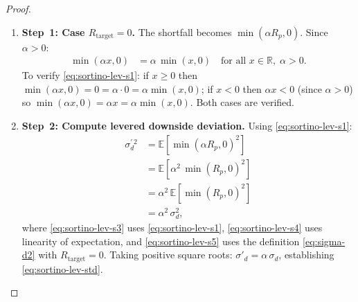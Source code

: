 \documentclass[12pt,openany]{book}
\newcommand{\E}{\mathbb{E}}
\numberwithin{equation}{chapter}
\theoremstyle{plain}
\theoremstyle{definition}
\theoremstyle{remark}
\numberwithin{equation}{chapter}
\theoremstyle{plain}
\begin{document}
\begin{proof}
\begin{enumerate}
  \item \textbf{Step~1: Case $R_{\mathrm{target}} = 0$.}
        The shortfall becomes
        $\min(\alpha R_p, 0)$.  Since $\alpha > 0$:
        \begin{align}
          \min(\alpha x, 0)
            &= \alpha\,\min(x, 0)
             \quad \text{for all } x \in \mathbb{R},\;
             \alpha > 0.
          \label{eq:sortino-lev-s1}
        \end{align}
        To verify \eqref{eq:sortino-lev-s1}: if $x \geq 0$
        then $\min(\alpha x,0) = 0 = \alpha\cdot 0
        = \alpha\min(x,0)$; if $x < 0$ then $\alpha x < 0$
        (since $\alpha > 0$) so $\min(\alpha x,0) = \alpha x
        = \alpha\min(x,0)$.  Both cases are verified.

  \item \textbf{Step~2: Compute levered downside deviation.}
        Using \eqref{eq:sortino-lev-s1}:
        \begin{align}
          \sigma_d^{\prime\,2}
            &= \E\!\left[\min(\alpha R_p,0)^{2}\right]
          \label{eq:sortino-lev-s2} \\
            &= \E\!\left[\alpha^{2}\,\min(R_p,0)^{2}\right]
          \label{eq:sortino-lev-s3} \\
            &= \alpha^{2}\,\E\!\left[\min(R_p,0)^{2}\right]
          \label{eq:sortino-lev-s4} \\
            &= \alpha^{2}\,\sigma_d^{2},
          \label{eq:sortino-lev-s5}
        \end{align}
        where \eqref{eq:sortino-lev-s3} uses
        \eqref{eq:sortino-lev-s1}, \eqref{eq:sortino-lev-s4}
        uses linearity of expectation, and
        \eqref{eq:sortino-lev-s5} uses the definition
        \eqref{eq:sigma-d2} with $R_{\mathrm{target}} = 0$.
        Taking positive square roots:
        $\sigma'_d = \alpha\,\sigma_d$,
        establishing \eqref{eq:sortino-lev-std}.


\end{enumerate}
\end{proof}
\end{document}
